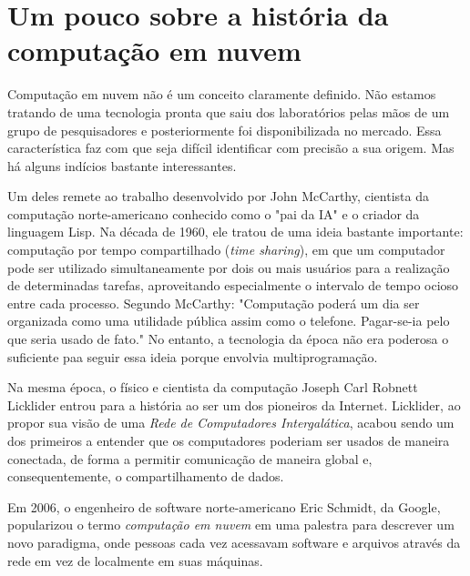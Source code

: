 \section{Um pouco sobre a história da computação em nuvem}

Computação em nuvem não é um conceito claramente definido. Não estamos tratando de
uma tecnologia pronta que saiu dos laboratórios pelas mãos de um grupo de
pesquisadores e posteriormente foi disponibilizada no mercado. Essa característica
faz com que seja difícil identificar com precisão a sua origem. Mas há alguns
indícios bastante interessantes.

Um deles remete ao trabalho desenvolvido por John McCarthy, cientista da computação
norte-americano conhecido como o "pai da IA" e o criador da linguagem Lisp. Na década de 1960,
ele tratou de uma ideia bastante importante: computação por tempo compartilhado (\emph{time sharing}),
em que um computador pode ser utilizado simultaneamente por dois ou mais usuários para a realização de
determinadas tarefas, aproveitando especialmente o intervalo de tempo ocioso entre cada processo.
Segundo McCarthy: "Computação poderá um dia ser organizada como uma utilidade pública assim como o
telefone. Pagar-se-ia pelo que seria usado de fato." No entanto, a tecnologia da época não era poderosa
o suficiente paa seguir essa ideia porque envolvia multiprogramação.

Na mesma época, o físico e cientista da computação Joseph Carl Robnett Licklider
entrou para a história ao ser um dos pioneiros da Internet. Licklider, ao propor sua visão
de uma \emph{Rede de Computadores Intergalática}, acabou sendo um dos primeiros a entender
que os computadores poderiam ser usados de maneira conectada, de forma a permitir comunicação
de maneira global e, consequentemente, o compartilhamento de dados.

Em 2006, o engenheiro de software norte-americano Eric Schmidt, da Google, popularizou o
termo \emph{computação em nuvem} em uma palestra para descrever um novo paradigma, onde
pessoas cada vez acessavam software e arquivos através da rede em vez de localmente em suas
máquinas.

